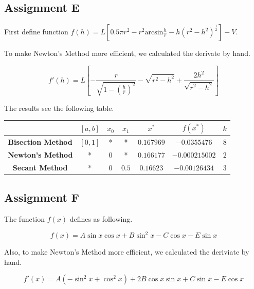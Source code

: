 \documentclass[11pt,en]{elegantpaper}
\begin{document}
\subsection{Assignment E}

First define function $f(h)=L\left[0.5\pi r^2 - r^2 \text{arcsin} \frac{h}{r}-h(r^2-h^2)^{\frac{1}{2}}\right]-V$.

To make Newton's Method more efficient, we calculated the derivate by hand.

\begin{equation*}
  f'(h)= L\left[-\frac{r}{\sqrt{1-\left(\frac{h}{r}\right)^2}}-\sqrt{r^2-h^2}+\frac{2h^2}{\sqrt{r^2-h^2}}\right]
\end{equation*}

The results see the following table.

\begin{table}[H]
  \centering
  \begin{tabular}{|c|c|c|c|c|c|c|}
  \hline
  \textbf{}                 & \textbf{$[a,b]$} & \textbf{$x_0$} & \textbf{$x_1$} & \textbf{$x^*$} & \textbf{$f(x^*)$} & \textbf{$k$} \\ \hline
  \textbf{Bisection Method} & $[0,1]$          & *              & *              & $0.167969$     & $-0.0355476$      & $8$          \\ \hline
  \textbf{Newton's Method}  & *                & $0$            & *              & $0.166177$     & $-0.000215002$    & $2$          \\ \hline
  \textbf{Secant Method}    & *                & $0$            & $0.5$          & $0.16623$      & $-0.00126434$     & $3$          \\ \hline
  \end{tabular}
\end{table}

\subsection{Assignment F}

The function $f(x)$ defines as following.

\begin{equation*}
  f(x)=A\sin x\cos x+B \sin^2 x - C\cos x - E\sin x
\end{equation*}

Also, to make Newton's Method more efficient, we calculated the deriviate by hand.

\begin{equation*}
  f'(x)=A(-\sin^2 x + \cos^2 x) + 2B\cos x\sin x + C\sin x - E\cos x
\end{equation*}
\end{document}
